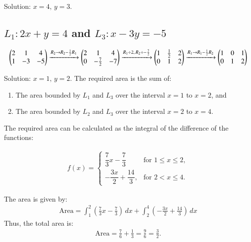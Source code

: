 \documentclass[journal]{IEEEtran}
\numberwithin{equation}{enumi}
\numberwithin{figure}{enumi}
\begin{document}
Solution: $x = 4, \, y = 3$.

\subsection*{ $L_1: 2x + y = 4$ and $L_3: x - 3y = -5$}

\begin{align*}
\begin{pmatrix}
2 & 1 & 4 \\
1 & -3 & -5
\end{pmatrix}
\xrightarrow{R_2 \to R_2 - \frac{1}{2}R_1}
\begin{pmatrix}
2 & 1 & 4 \\
0 & -\frac{7}{2} & -7
\end{pmatrix}
\xrightarrow{R_1 \div 2, \, R_2 \div -\frac{7}{2}}
\begin{pmatrix}
1 & \frac{1}{2} & 2 \\
0 & 1 & 2
\end{pmatrix}
\xrightarrow{R_1 \to R_1 - \frac{1}{2}R_2}
\begin{pmatrix}
1 & 0 & 1 \\
0 & 1 & 2
\end{pmatrix}
\end{align*}


Solution: $x = 1, \, y = 2$.
The required area is the sum of:  
\begin{enumerate}
    \item The area bounded by $ L_1 $ and $ L_3 $ over the interval $ x = 1 $ to $ x = 2 $, and  
    \item The area bounded by $ L_2 $ and $ L_3 $ over the interval $ x = 2 $ to $ x = 4 $.  
\end{enumerate}

The required area can be calculated as the integral of the difference of the functions:  



\begin{align}
f(x) = 
\begin{cases} 
     \dfrac{7}{3}x - \dfrac{7}{3}
 & \text{for } 1 \leq x \leq 2, \\[10pt]
 -\dfrac{3x}{2} + \dfrac{14}{3}, & \text{for } 2 < x \leq 4.
\end{cases}
\end{align}



The area is given by:  
\begin{align}
   \text{Area} = \int_{1}^{2} \left( \frac{7}{3}x - \frac{7}{3} \right) \, dx
+ \int_{2}^{4} \left( -\frac{3x}{2} + \frac{14}{3} \right) \, dx
\end{align}
Thus, the total area is:  
\begin{align}
   \text{Area} = \frac{7}{6} + \frac{1}{3} = \frac{9}{6} = \frac{3}{2}. 
\end{align}
\end{document}
